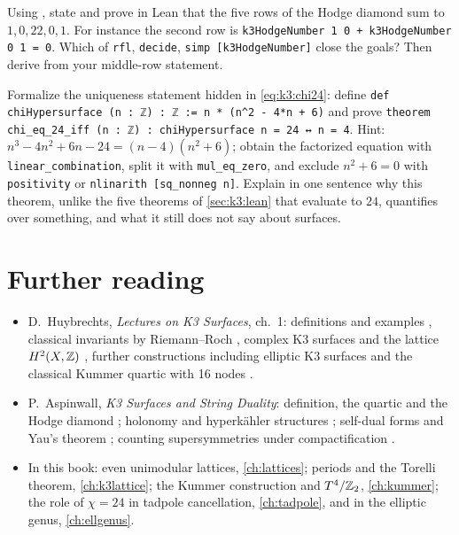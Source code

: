 \begin{exercise}
Using , state and prove in Lean that the five rows of the Hodge diamond sum
to $1,0,22,0,1$. For instance the second row is
\texttt{k3HodgeNumber 1 0 + k3HodgeNumber 0 1 = 0}. Which of \texttt{rfl}, \texttt{decide},
\texttt{simp [k3HodgeNumber]} close the goals? Then derive  from your middle-row
statement.
\end{exercise}

\begin{exercise}
Formalize the uniqueness statement hidden in \eqref{eq:k3:chi24}: define
\texttt{def chiHypersurface (n : ℤ) : ℤ := n * (n\^{}2 - 4*n + 6)} and prove
\texttt{theorem chi\_eq\_24\_iff (n : ℤ) : chiHypersurface n = 24 ↔ n = 4}.
Hint: $n^3-4n^2+6n-24=(n-4)(n^2+6)$; obtain the factorized equation with
\texttt{linear\_combination}, split it with \texttt{mul\_eq\_zero}, and exclude $n^2+6=0$ with
\texttt{positivity} or \texttt{nlinarith [sq\_nonneg n]}. Explain in one sentence why this
theorem, unlike the five theorems of \cref{sec:k3:lean} that evaluate to $24$, quantifies over
something, and what it still does not say about surfaces.
\end{exercise}

\section*{Further reading}

\begin{itemize}[leftmargin=*,itemsep=2pt]
\item D.~Huybrechts, \emph{Lectures on K3 Surfaces}, ch.~1: definitions and examples
  , classical invariants by Riemann--Roch
  , complex K3 surfaces and the lattice $H^2(X,\mathbb{Z})$
  , further constructions including elliptic K3 surfaces and
  the classical Kummer quartic with 16 nodes .
\item P.~Aspinwall, \emph{K3 Surfaces and String Duality}: definition, the quartic and the
  Hodge diamond ; holonomy and hyperkähler structures
  ; self-dual forms and Yau's theorem ; counting supersymmetries under compactification .
\item In this book: even unimodular lattices, \cref{ch:lattices}; periods and the Torelli
  theorem, \cref{ch:k3lattice}; the Kummer construction and $T^4/\mathbb{Z}_2$, \cref{ch:kummer}; the
  role of $\chi=24$ in tadpole cancellation, \cref{ch:tadpole}, and in the elliptic genus,
  \cref{ch:ellgenus}.
\end{itemize}

